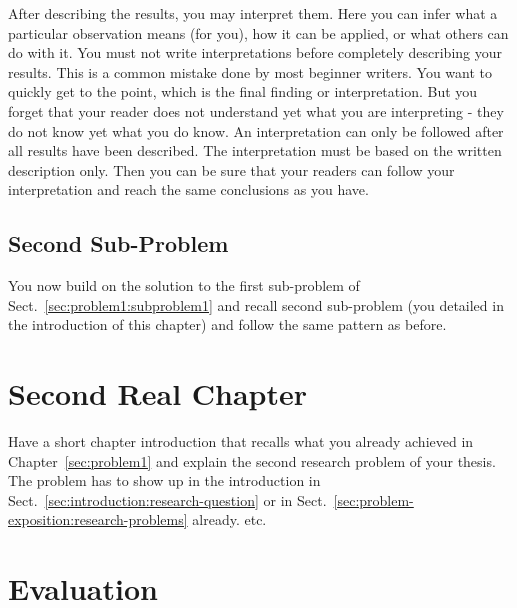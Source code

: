 \documentclass[12pt,a4paper,footinclude=true,twoside,headinclude=true]{report}
\begin{document}
\textsf{After describing the results, you may interpret them.} Here you can infer what a particular observation means (for you), how it can be applied, or what others can do with it. You must not write interpretations before completely describing your results. This is a common mistake done by most beginner writers. You want to quickly get to the point, which is the final finding or interpretation. But you forget that your reader does not understand yet what you are interpreting - they do not know yet what you do know. An interpretation can only be followed after all results have been described. The interpretation must be based on the written description only. Then you can be sure that your readers can follow your interpretation and reach the same conclusions as you have.

\section{Second Sub-Problem}\label{sec:problem1:subproblem2}

You now build on the solution to the first sub-problem of Sect.~\ref{sec:problem1:subproblem1} and recall second sub-problem (you detailed in the introduction of this chapter) and follow the same pattern as before.

\chapter{Second Real Chapter}\label{sec:sub-problem2}

Have a short chapter introduction that recalls what you already achieved in Chapter~\ref{sec:problem1} and explain the second research problem of your thesis. The problem has to show up in the introduction in Sect.~\ref{sec:introduction:research-question} or in Sect.~\ref{sec:problem-exposition:research-problems} already. etc.

\chapter{Evaluation}\label{sec:evaluation}
\end{document}
